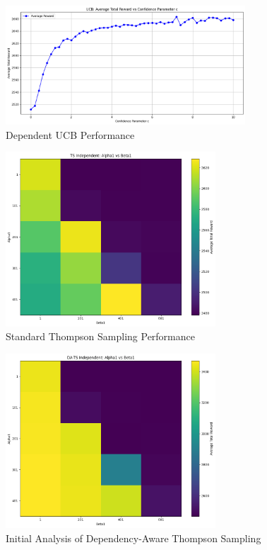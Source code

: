 \documentclass[11pt]{article}
\begin{document}
\begin{figure}[H]
    \centering
    \includegraphics[width=0.8\textwidth]{pics/ucb_dependence.png}
    \caption{Dependent UCB Performance}
    \label{fig:dep_ucb}
\end{figure}

\begin{figure}[H]
    \centering
    \includegraphics[width=0.7\textwidth]{pics/ts1.png}
    \caption{Standard Thompson Sampling Performance}
    \label{fig:dep_ts_standard}
\end{figure}

\begin{figure}[H]
    \centering
    \includegraphics[width=0.7\textwidth]{pics/dats1.png}
    \caption{Initial Analysis of Dependency-Aware Thompson Sampling}
    \label{fig:dep_dats_initial}
\end{figure}
\end{document}
